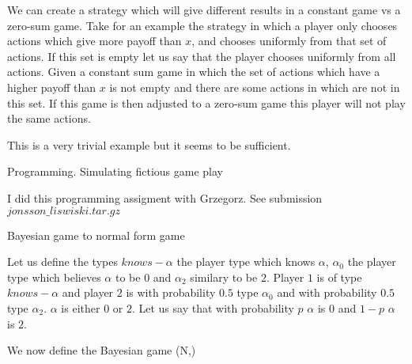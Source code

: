 \documentclass[12pt]{article}
\newenvironment{question}[2][Question]{\begin{trivlist}
\item[\hskip \labelsep {\bfseries #1}\hskip \labelsep {\bfseries #2.}]}{\end{trivlist}}
\newenvironment{answer}[2][Answer]{\begin{trivlist}
\item[\hskip \labelsep {\bfseries #1}\hskip \labelsep {\bfseries #2:}]}{\end{trivlist}}
\begin{document}
\begin{answer}{b)}
We can create a strategy which will give different results in a constant game vs a zero-sum game. Take for an example the strategy in which a player only chooses actions which give more payoff than $x$, and chooses uniformly from that set of actions. If this set is empty let us say that the player chooses uniformly from all actions. Given a constant sum game in which the set of actions which have a higher payoff than $x$ is not empty and there are some actions in which are not in this set. If this game is then adjusted to a zero-sum game this player will not play the same actions.

This is a very trivial example but it seems to be sufficient.
\end{answer}
\begin{question}{2}
Programming. Simulating fictious game play
\end{question}
\begin{answer}{a)}
I did this programming assigment with Grzegorz.
See submission $jonsson\_liswiski.tar.gz$
\end{answer}

\begin{question}{3}
Bayesian game to normal form game
\end{question}
\begin{answer}{a)}
Let us define the types $knows-\alpha$ the player type which knows $\alpha$, $\alpha_0$ the player type which believes $\alpha$ to be $0$ and $\alpha_2$ similary to be $2$. Player $1$ is of type $knows-\alpha$ and player $2$ is with probability $0.5$ type $\alpha_0$ and with probability $0.5$ type $\alpha_2$. $\alpha$ is either $0$ or $2$. Let us say that with probability $p$ $\alpha$ is $0$ and $1-p$ $\alpha$ is $2$.

We now define the Bayesian game (N,)
\end{answer}
\end{document}
